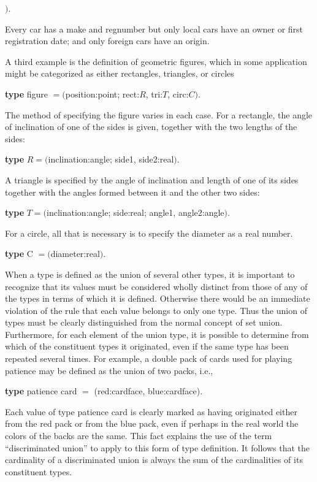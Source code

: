 \tabto{7.1em}$)$.

\noindent
Every car has a make and regnumber but only local cars have an owner or first registration date; and only foreign cars have an origin. 

A third example is the definition of geometric figures, which in some application might be categorized as either rectangles, triangles, or circles

\quad \textbf{type} figure $= ($position:point; rect:$R$, tri:$T$, circ:$C)$.

\noindent
The method of specifying the figure varies in each case. For a rectangle, the angle of inclination of one of the sides is given, together with the two lengths of the sides:

\quad \textbf{type} $R = ($inclination:angle; side1, side2:real$)$.

\noindent
A triangle is specified by the angle of inclination and length of one of its sides together with the angles formed between it and the other two sides:

\quad \textbf{type} $T = ($inclination:angle; side:real; angle1, angle2:angle$)$.

\noindent
For a circle, all that is necessary is to specify the diameter as a real number.

\quad \textbf{type} C $= ($diameter:real$)$.

When a type is defined as the union of several other types, it is important to recognize that its values must be considered wholly distinct from those of any of the types in terms of which it is defined. Otherwise there would be an immediate violation of the rule that each value belongs to only one type. Thus the union of types must be clearly distinguished from the normal concept of set union. Furthermore, for each element of the union type, it is possible to determine from which of the constituent types it originated, even if the same type has been repeated several times. For example, a double pack of cards used for playing patience may be defined as the union of two packs, i.e.,

\quad \textbf{type} patience card $=$ (red:cardface, blue:cardface).

\noindent
Each value of type patience card is clearly marked as having originated either from the red pack or from the blue pack, even if perhaps in the real world the colors of the backs are the same. This fact explains the use of the term ``discriminated union'' to apply to this form of type definition. It follows that the cardinality of a discriminated union is always the sum of the cardinalities of its constituent types.

